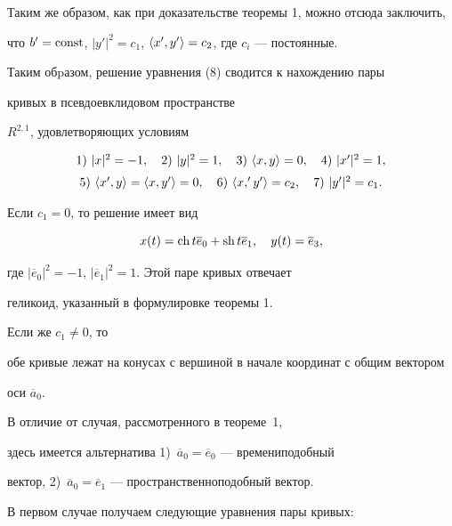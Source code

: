 \begin{pf}
Таким же образом, как при доказательстве теоремы 1, можно отсюда заключить, 


что $b'=\operatorname{const}$, $|y'|^2=c_1$, $\langle x',y'\rangle=c_2$, где $c_i$ --- постоянные. 


Таким обpазом, решение уравнения (8) сводится к нахождению пары 


кривых в псевдоевклидовом пространстве 


$R^{2,1}$, удовлетворяющих условиям


\begin{equation}


\begin{array}{c}


1)\ |x|^2=-1,\quad 2)\ |y|^2=1,\quad 3)\ \la x,y\ra =0,\quad 4)\ |x'|^2=1,\\[2mm]


5)\ \la x',y\ra=\la x,y'\ra=0,\quad 6)\ \la x,'y'\ra=c_2,\quad 7)\ |y'|^2=c_1.


\end{array}


\end{equation}





Если $c_1=0$, то решение имеет вид


$$


x(t)=\ch t \overline e_0+\sh t \overline e_1,\quad y(t)= \overline e_3,


$$


где $| \overline e_0|^2=-1$, $|\overline e_1|^2=1$. Этой паре кривых отвечает 


геликоид, указанный в формулировке теоремы 1. 


Если же $c_1 \neq 0$, то


обе кривые лежат на конусах с вершиной в начале координат с общим вектором 


оси $ \overline a_0$.





В отличие от случая, рассмотренного в теореме~1, 


здесь имеется альтернатива 1)~$\overline a_0= \overline e_0$ --- времениподобный 


вектор, 2)~$ \overline a_0 =\overline e_1$ --- пространственноподобный вектор.


В первом случае получаем следующие уравнения пары кривых:


\begin{gather*}



\end{gather*}
\end{pf}
